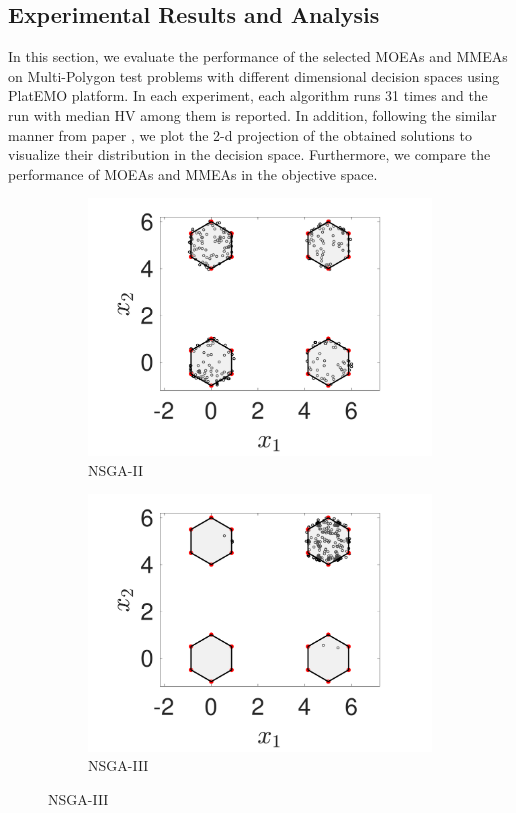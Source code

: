 \documentclass[conference]{IEEEtran}
\begin{document}
\subsection{Experimental Results and Analysis}
\label{Experimental Results}
In this section, we evaluate the performance of the selected MOEAs and MMEAs on Multi-Polygon test problems with different dimensional decision spaces using PlatEMO platform\cite{PlatEMO}. In each experiment, each algorithm runs 31 times and the run with median HV among them is reported. In addition, following the similar manner from paper \cite{Hisao}, we plot the 2-d projection of the obtained solutions to visualize their distribution in the decision space. Furthermore, we compare the performance of MOEAs and MMEAs in the objective space.
\begin{figure}[htbp]
    \centering
    \begin{subfigure}[b]{.24\textwidth}
    \includegraphics[width=\linewidth]{Section5/dim2/PS/NSGAII}
    \caption{NSGA-II}
    \end{subfigure}
    \begin{subfigure}[b]{.24\textwidth}
    \includegraphics[width=\linewidth]{Section5/dim2/PS/NSGAIII}
    \caption{NSGA-III}
    \end{subfigure}
    

\end{figure}
\end{document}
